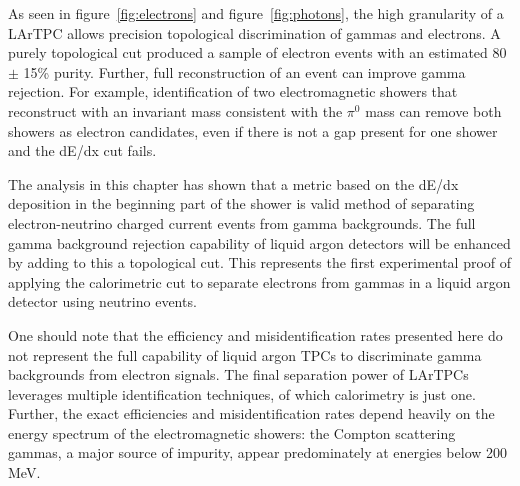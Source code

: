 As seen in figure~\ref{fig:electrons} and figure~\ref{fig:photons}, the high granularity of a LArTPC allows precision topological discrimination of gammas and electrons.  A purely topological cut produced a sample of electron events with an estimated 80 $\pm$ 15\% purity.  Further, full reconstruction of an event can improve gamma rejection.  For example, identification of two electromagnetic showers that reconstruct with an invariant mass consistent with the $\pi^0$ mass can remove both showers as electron candidates, even if there is not a gap present for one shower and the dE/dx cut fails.

The analysis in this chapter has shown that a metric based on the dE/dx deposition in the beginning part of the shower is valid method of separating electron-neutrino charged current events from gamma backgrounds. The full gamma background rejection capability of liquid argon detectors will be enhanced by adding to this a topological cut. This represents the first experimental proof of applying the calorimetric cut to separate electrons from gammas in a liquid argon detector using neutrino events.

One should note that the efficiency and misidentification rates presented here do not represent the full capability of liquid argon TPCs to discriminate gamma backgrounds from electron signals. The final separation power of LArTPCs leverages multiple identification techniques, of which calorimetry is just one.  Further, the exact efficiencies and misidentification rates depend heavily on the energy spectrum of the electromagnetic showers: the Compton scattering gammas, a major source of impurity, appear predominately at energies below 200 MeV.


